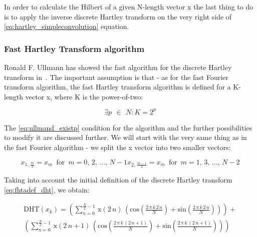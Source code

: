 \documentclass[12pt,twoside,a4paper]{article}
\numberwithin{equation}{subsection}
\numberwithin{figure}{subsection}
\begin{document}
In order to calculate the Hilbert of a given N-length vector x the last thing to do is to apply the inverse discrete Hartley
transform on the very right side of \ref{eq:hartley_simpleconvolution} equation.

\subsubsection*{Fast Hartley Transform algorithm}

Ronald F. Ullmann has showed the fast algorithm for the discrete Hartley transform in~\cite{ullmann_algorithm}. The important
assumption is that - as for the fast Fourier transform algorithm, the fast Hartley transform algorithm is defined for a K-length
vector x, where K is the power-of-two:

\begin{equation} \label{eq:ullmand_existp}
  \exists p\,\ \in\ \,N : K=2^{p}
\end{equation}


The \ref{eq:ullmand_existp} condition for the algorithm and the further possibilities to modify it are discussed further. We will
start with the very same thing as in the fast Fourier algorithm - we split the x vector into two smaller vectors:

\begin{subequations} \label{eq:hartley_smallervectors}
  \begin{equation}   \label{eq:hsvs_even}
    x_{1, \, \frac     {m}{2}} = x_m \, \mbox{ for } \, m = 0, \, 2, \, \ldots, \, N - 1
  \end{equation}
  \begin{equation}   \label{eq:hsvs_odd}
    x_{2, \, \frac {m - 1}{2}} = x_m \, \mbox{ for } \, m = 1, \, 3, \, \ldots, \, N - 2
  \end{equation}
\end{subequations}

Taking into account the initial definition of the discrete Hartley transform \ref{eq:fhtadef_dht}, we obtain:

\begin{multline}  \label{eq:hartley_longdht}
 \mathrm{DHT}(x_k) = \left( 
 	\sum_{n = 0}^{\frac {N}{2} - 1} \, \mathrm{x}(2 \, n) \, (
 		\mathrm{cos} \left( \frac {2 \, \pi \, k \, 2 \, n}{N} \right) 
  	  + \mathrm{sin} \left( \frac {2 \, \pi \, k \, 2 \, n}{N} \right) ) \right)  
 + \\ \left( 
 	\sum_{n = 0}^{\frac {N}{2} - 1} \, \mathrm{x}(2 \, n + 1) \, (
 		\mathrm{cos} \left( \frac {2 \, \pi \, k \, (2 \, n + 1)}{N} \right) 
 	  + \mathrm{sin} \left( \frac {2 \, \pi \, k \, (2 \, n + 1)}{N} \right) ) \right)
\end{multline}
\end{document}
